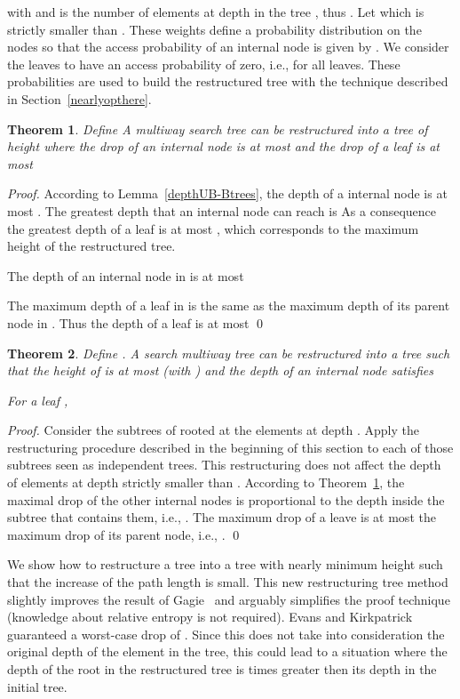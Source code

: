 \documentclass{llncs}\usepackage[english]{babel}
\newtheorem{thm}{Theorem}
\begin{document}
with  and  is the number of elements at depth  in the tree , thus . Let  which is strictly smaller than . These weights define a probability distribution on the nodes so that the access probability of an internal node  is given by . We consider the leaves to have an access probability of zero, i.e.,  for all leaves. These probabilities are used to build the restructured tree  with the technique described in Section~\ref{nearlyopthere}. 
\begin{thm}
\label{dropdepth1}
Define  A multiway search tree  can be restructured into a tree  of height  where the drop of an internal node  is at most  and the drop of a leaf  is at most 
\end{thm}
\begin{proof}
According to Lemma~\ref{depthUB-Btrees}, the depth of a internal node is at most . The greatest depth that an internal node can reach is   As a consequence the greatest depth of a leaf is at most , which corresponds to the maximum height of the restructured tree.

The depth of an internal node  in  is at most 

The maximum depth of a leaf in  is the same as the maximum depth of its parent node in . Thus the depth of a leaf  is at most 
\qed \end{proof}

\begin{thm}
\label{dropdepthh}
Define . A search multiway tree  can be restructured into a tree  such that the height of  is at most  (with ) and the depth of an internal node  satisfies 

For a leaf , 


\end{thm}
\begin{proof}
Consider the subtrees of  rooted at the elements at depth . Apply the restructuring procedure described in the beginning of this section to each of those subtrees seen as independent trees. This restructuring does not affect the depth of elements at depth strictly smaller than . According to Theorem~\ref{dropdepth1}, the maximal drop of the other internal nodes  is proportional to the depth inside the subtree that contains them, i.e., . The maximum drop of a leave  is at most the maximum drop of its parent node, i.e., .
\qed \end{proof}

We show how to restructure a tree  into a tree  with nearly minimum height such that the increase of the path length is small. This new restructuring tree method slightly improves the result of Gagie~\cite{Gagie} and arguably simplifies the proof technique (knowledge about relative entropy is not required). Evans and Kirkpatrick~\cite{restructuringordered} guaranteed a worst-case drop of . Since this does not take into consideration the original depth of the element in the tree, this could lead to a situation where the depth of the root in the restructured tree is  times greater then its depth in the initial tree. 
\end{document}
